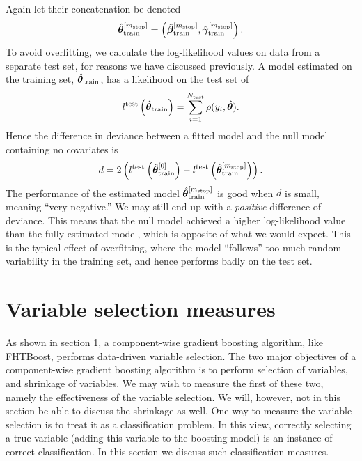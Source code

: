 Again let their concatenation be denoted
\begin{equation*}
    \hat{\boldsymbol{\theta}}^{[m_{\text{stop}}]}_{\text{train}}=\left(\hat{\boldsymbol{\beta}}^{[m_{\text{stop}}]}_{\text{train}},\hat{\boldsymbol{\gamma}}^{[m_{\text{stop}}]}_{\text{train}}\right).
\end{equation*}
To avoid overfitting, we calculate the log-likelihood values on data from a separate test set, for reasons we have discussed previously.
A model estimated on the training set, $\hat{\boldsymbol{\theta}}_{\text{train}}$, has a likelihood on the test set of
\begin{equation}
    l^{\text{test}}\left(\hat{\boldsymbol{\theta}}_{\text{train}}\right)=\sum_{i=1}^{N_{\text{test}}}\rho(y_i, \hat{\boldsymbol{\theta}}).
\end{equation}
Hence the difference in deviance between a fitted model and the null model containing no covariates is
\begin{equation*}
    d=2\left(l^{\text{test}}\left(\hat{\boldsymbol{\theta}}^{[0]}_{\text{train}}\right)-l^{\text{test}}\left(\hat{\boldsymbol{\theta}}^{[m_{\text{stop}}]}_{\text{train}}\right)\right).
\end{equation*}
The performance of the estimated model $\hat{\boldsymbol{\theta}}^{[m_{\text{stop}}]}_{\text{train}}$ is good when $d$ is small, meaning ``very negative.''
We may still end up with a \textit{positive} difference of deviance.
This means that the null model achieved a higher log-likelihood value than the fully estimated model, which is opposite of what we would expect.
This is the typical effect of overfitting, where the model ``follows'' too much random variability in the training set, and hence performs badly on the test set.


\section{Variable selection measures}
\label{sec:variable-selection}
As shown in section \ref{sec:variable-selection}, a component-wise gradient boosting algorithm, like FHTBoost, performs data-driven variable selection.
The two major objectives of a component-wise gradient boosting algorithm is to perform selection of variables, and shrinkage of variables.
We may wish to measure the first of these two, namely the effectiveness of the variable selection.
We will, however, not in this section be able to discuss the shrinkage as well.
One way to measure the variable selection is to treat it as a classification problem.
In this view, correctly selecting a true variable (adding this variable to the boosting model) is an instance of correct classification.
In this section we discuss such classification measures.

